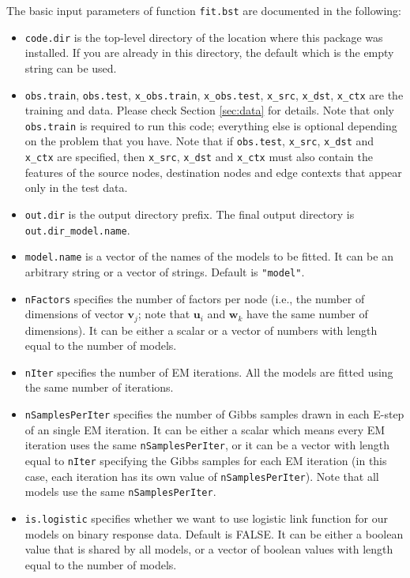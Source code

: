 The basic input parameters of function {\tt fit.bst} are documented in the following:
\begin{itemize}
\item {\tt code.dir} is the top-level directory of the location where this package was installed. If you are already in this directory, the default which is the empty string can be used.
\item {\tt obs.train}, {\tt obs.test}, {\tt x\_obs.train}, {\tt x\_obs.test}, {\tt x\_src}, {\tt x\_dst}, {\tt x\_ctx} are the training and data. Please check Section \ref{sec:data} for details.  Note that only {\tt obs.train} is required to run this code; everything else is optional depending on the problem that you have.  Note that if {\tt obs.test}, {\tt x\_src}, {\tt x\_dst} and {\tt x\_ctx} are specified, then {\tt x\_src}, {\tt x\_dst} and {\tt x\_ctx} must also contain the features of the source nodes, destination nodes and edge contexts that appear only in the test data.
\item {\tt out.dir} is the output directory prefix. The final output directory is {\tt out.dir\_model.name}. 
\item {\tt model.name} is a vector of the names of the models to be fitted.  It can be an arbitrary string or a vector of strings.  Default is {\tt "model"}.
\item {\tt nFactors} specifies the number of factors per node (i.e., the number of dimensions of vector $\bm{v}_j$; note that $\bm{u}_i$ and $\bm{w}_k$ have the same number of dimensions).  It can be either a scalar or a vector of numbers with length equal to the number of models.
\item {\tt nIter} specifies the number of EM iterations.  All the models are fitted using the same number of iterations.
\item {\tt nSamplesPerIter} specifies the number of Gibbs samples drawn in each E-step of an single EM iteration.  It can be either a scalar which means every EM iteration uses the same {\tt nSamplesPerIter}, or it can be a vector with length equal to {\tt nIter} specifying the Gibbs samples for each EM iteration (in this case, each iteration has its own value of {\tt nSamplesPerIter}).  Note that all models use the same {\tt nSamplesPerIter}.
\item {\tt is.logistic} specifies whether we want to use logistic link function for our models on binary response data. Default is FALSE. It can be either a boolean value that is shared by all models, or a vector of boolean values with length equal to the number of models.

\end{itemize}
